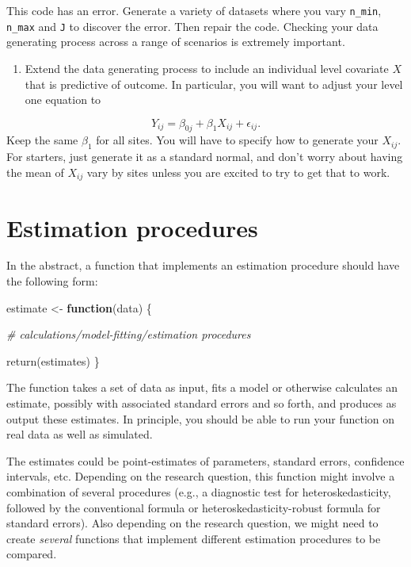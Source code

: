 \documentclass[
]{book}
\newenvironment{Shaded}{\begin{snugshade}}{\end{snugshade}}
\newcommand{\CommentTok}[1]{\textcolor[rgb]{0.56,0.35,0.01}{\textit{#1}}}
\newcommand{\ControlFlowTok}[1]{\textcolor[rgb]{0.13,0.29,0.53}{\textbf{#1}}}
\newcommand{\FunctionTok}[1]{\textcolor[rgb]{0.00,0.00,0.00}{#1}}
\newcommand{\NormalTok}[1]{#1}
\newcommand{\OtherTok}[1]{\textcolor[rgb]{0.56,0.35,0.01}{#1}}
\providecommand{\tightlist}{%
  \setlength{\itemsep}{0pt}\setlength{\parskip}{0pt}}
\begin{document}
This code has an error. Generate a variety of datasets where you vary \texttt{n\_min}, \texttt{n\_max} and \texttt{J} to discover the error. Then repair the code.
Checking your data generating process across a range of scenarios is extremely important.

\begin{enumerate}
\def\labelenumi{\arabic{enumi}.}
\setcounter{enumi}{5}
\tightlist
\item
  Extend the data generating process to include an individual level covariate \(X\) that is predictive of outcome. In particular, you will want to adjust your level one equation to
\end{enumerate}

\[ Y_{ij} = \beta_{0j} + \beta_{1} X_{ij} + \epsilon_{ij} . \]
Keep the same \(\beta_1\) for all sites.
You will have to specify how to generate your \(X_{ij}\).
For starters, just generate it as a standard normal, and don't worry about having the mean of \(X_{ij}\) vary by sites unless you are excited to try to get that to work.

\hypertarget{estimation-procedures}{%
\chapter{Estimation procedures}\label{estimation-procedures}}

In the abstract, a function that implements an estimation procedure should have the following form:

\begin{Shaded}
\begin{Highlighting}[]
\NormalTok{estimate }\OtherTok{\textless{}{-}} \ControlFlowTok{function}\NormalTok{(data) \{}

  \CommentTok{\# calculations/model{-}fitting/estimation procedures}
  
  \FunctionTok{return}\NormalTok{(estimates)}
\NormalTok{\}}
\end{Highlighting}
\end{Shaded}

The function takes a set of data as input, fits a model or otherwise calculates an estimate, possibly with associated standard errors and so forth, and produces as output these estimates.
In principle, you should be able to run your function on real data as well as simulated.

The estimates could be point-estimates of parameters, standard errors, confidence intervals, etc.
Depending on the research question, this function might involve a combination of several procedures (e.g., a diagnostic test for heteroskedasticity, followed by the conventional formula or heteroskedasticity-robust formula for standard errors).
Also depending on the research question, we might need to create \emph{several} functions that implement different estimation procedures to be compared.
\end{document}
